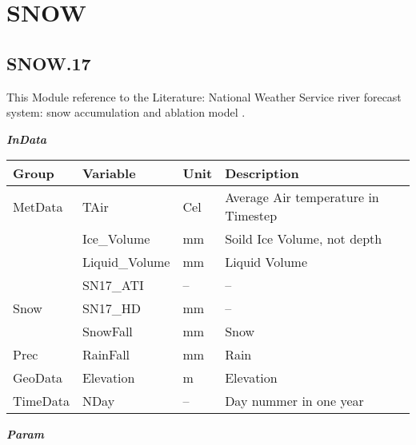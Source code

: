 \documentclass[
]{book}
\begin{document}
\hypertarget{snow}{%
\section{SNOW}\label{snow}}

\hypertarget{snow.17}{%
\subsection{SNOW.17}\label{snow.17}}

This Module reference to the Literature: National Weather Service river forecast system: snow accumulation and ablation model \citep{Anderson.1973}.

\textbf{\emph{InData}}

\begin{table}[!h]
\centering
\begin{tabular}{l|l|l|l}
\hline
Group & Variable & Unit & Description\\
\hline
MetData & TAir & Cel & Average Air temperature in Timestep\\
\cline{1-4}
 & Ice\_Volume & mm & Soild Ice Volume, not depth\\
\cline{2-4}
 & Liquid\_Volume & mm & Liquid Volume\\
\cline{2-4}
 & SN17\_ATI & -- & --\\
\cline{2-4}
\multirow{-4}{*}{\raggedright\arraybackslash Snow} & SN17\_HD & mm & --\\
\cline{1-4}
 & SnowFall & mm & Snow\\
\cline{2-4}
\multirow{-2}{*}{\raggedright\arraybackslash Prec} & RainFall & mm & Rain\\
\cline{1-4}
GeoData & Elevation & m & Elevation\\
\cline{1-4}
TimeData & NDay & -- & Day nummer in one year\\
\hline
\end{tabular}
\end{table}

\textbf{\emph{Param}}
\end{document}
